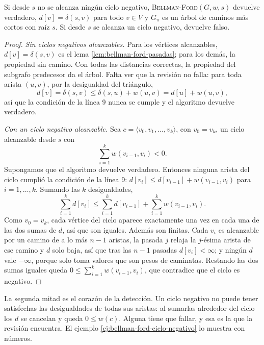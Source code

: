\documentclass[11pt,letterpaper]{article}
\begin{document}
\begin{teorema}
  \label{teo:bellman-ford-correccion}
  Si desde $s$ no se alcanza ningún ciclo negativo,
  \textsc{Bellman-Ford}$(G, w, s)$ devuelve verdadero,
  $d[v] = \delta(s, v)$ para todo $v \in V$ y $G_\pi$ es un árbol de
  caminos más cortos con raíz $s$. Si desde $s$ se alcanza un ciclo
  negativo, devuelve falso.
\end{teorema}

\begin{proof}
  \textit{Sin ciclos negativos alcanzables.} Para los vértices
  alcanzables, $d[v] = \delta(s, v)$ es el lema
  \ref{lem:bellman-ford-pasadas}; para los demás, la propiedad sin
  camino. Con todas las distancias correctas, la propiedad del
  subgrafo predecesor da el árbol. Falta ver que la revisión no
  falla: para toda arista $(u, v)$, por la desigualdad del triángulo,
  \[
    d[v] = \delta(s, v) \le \delta(s, u) + w(u, v)
         = d[u] + w(u, v) ,
  \]
  así que la condición de la línea 9 nunca se cumple y el algoritmo
  devuelve verdadero.

  \textit{Con un ciclo negativo alcanzable.} Sea
  $c = \langle v_0, v_1, \dots, v_k\rangle$, con $v_0 = v_k$, un ciclo
  alcanzable desde $s$ con
  \[
    \sum_{i=1}^{k} w(v_{i-1}, v_i) < 0 .
  \]
  Supongamos que el algoritmo devuelve verdadero. Entonces ninguna
  arista del ciclo cumplió la condición de la línea 9:
  $d[v_i] \le d[v_{i-1}] + w(v_{i-1}, v_i)$ para $i = 1, \dots, k$.
  Sumando las $k$ desigualdades,
  \[
    \sum_{i=1}^{k} d[v_i] \le \sum_{i=1}^{k} d[v_{i-1}]
      + \sum_{i=1}^{k} w(v_{i-1}, v_i) .
  \]
  Como $v_0 = v_k$, cada vértice del ciclo aparece exactamente una vez
  en cada una de las dos sumas de $d$, así que son iguales. Además
  son finitas. Cada $v_i$ es alcanzable por un camino de a lo más
  $n - 1$ aristas, la pasada $j$ relaja la $j$-ésima arista de ese
  camino y $d$ solo baja, así que tras las $n - 1$ pasadas
  $d[v_i] < \infty$; y ningún $d$ vale $-\infty$, porque solo toma
  valores que son pesos de caminatas. Restando las dos sumas iguales
  queda $0 \le \sum_{i=1}^{k} w(v_{i-1}, v_i)$, que contradice que el
  ciclo es negativo.
\end{proof}

La segunda mitad es el corazón de la detección. Un ciclo negativo no
puede tener satisfechas las desigualdades de todas sus aristas: al
sumarlas alrededor del ciclo los $d$ se cancelan y queda
$0 \le w(c)$. Alguna tiene que fallar, y esa es la que la revisión
encuentra. El ejemplo \ref{ej:bellman-ford-ciclo-negativo} lo muestra
con números.
\end{document}
